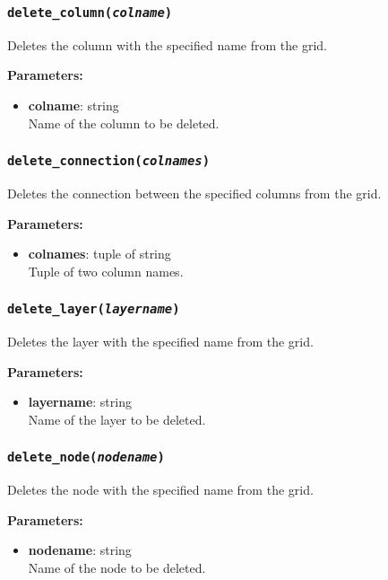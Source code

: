 \subsubsection{\texttt{delete\_column(\emph{colname})}}
\label{sec:delete_column}

Deletes the column with the specified name from the grid.

\textbf{Parameters:}
\begin{itemize}
\item \textbf{colname}: string\\
  Name of the column to be deleted.
\end{itemize}

\subsubsection{\texttt{delete\_connection(\emph{colnames})}}
\label{sec:delete_connection}

Deletes the connection between the specified columns from the grid.

\textbf{Parameters:}
\begin{itemize}
\item \textbf{colnames}: tuple of string\\
  Tuple of two column names.
\end{itemize}

\subsubsection{\texttt{delete\_layer(\emph{layername})}}
\label{sec:delete_layer}

Deletes the layer with the specified name from the grid.

\textbf{Parameters:}
\begin{itemize}
\item \textbf{layername}: string\\
  Name of the layer to be deleted.
\end{itemize}

\subsubsection{\texttt{delete\_node(\emph{nodename})}}
\label{sec:delete_node}

Deletes the node with the specified name from the grid.

\textbf{Parameters:}
\begin{itemize}
\item \textbf{nodename}: string\\
  Name of the node to be deleted.
\end{itemize}

